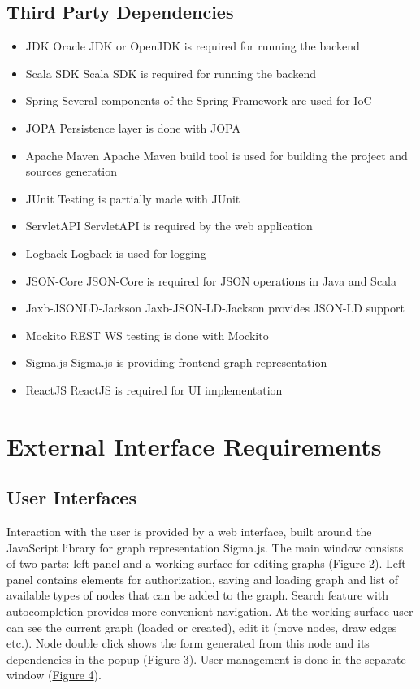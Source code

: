 \documentclass{article}
\begin{document}
\subsection{Third Party Dependencies}
\begin{itemize}
    \item JDK
	Oracle JDK or OpenJDK is required for running the backend
    \item Scala SDK
	Scala SDK is required for running the backend
    \item Spring
	Several components of the Spring Framework are used for IoC
    \item JOPA
	Persistence layer is done with JOPA
    \item Apache Maven
	Apache Maven build tool is used for building the project and sources generation
    \item JUnit
	Testing is partially made with JUnit
    \item ServletAPI
	ServletAPI is required by the web application 
    \item Logback
	Logback is used for logging
    \item JSON-Core
	JSON-Core is required for JSON operations in Java and Scala
    \item Jaxb-JSONLD-Jackson
	Jaxb-JSON-LD-Jackson provides JSON-LD support
    \item Mockito
	REST WS testing is done with Mockito
    \item Sigma.js
	Sigma.js is providing frontend graph representation
    \item ReactJS
	ReactJS is required for UI implementation
\end{itemize}
\section{External Interface Requirements}
\subsection{User Interfaces}
Interaction with the user is provided by a web interface, built around the JavaScript library for graph representation Sigma.js. The main window consists of two parts: left panel and a working surface for editing graphs (\hyperref[pic1]{Figure 2}). Left panel contains elements for authorization, saving and loading graph and list of available types of nodes that can be added to the graph. Search feature with autocompletion provides more convenient navigation. At the working surface user can see the current graph (loaded or created), edit it (move nodes, draw edges etc.). Node double click shows the form generated from this node and its dependencies in the popup (\hyperref[pic2]{Figure 3}). User management is done in the separate window (\hyperref[pic3]{Figure 4}).
\end{document}
